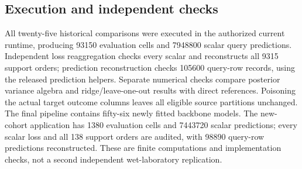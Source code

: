 \subsection{Execution and independent checks}
All twenty-five historical comparisons were executed in the authorized current runtime, producing 93150 evaluation cells and 7948800 scalar query predictions. Independent loss reaggregation checks every scalar and reconstructs all 9315 support orders; prediction reconstruction checks 105600 query-row records, using the released prediction helpers. Separate numerical checks compare posterior variance algebra and ridge/leave-one-out results with direct references. Poisoning the actual target outcome columns leaves all eligible source partitions unchanged. The final pipeline contains fifty-six newly fitted backbone models. The new-cohort application has 1380 evaluation cells and 7443720 scalar predictions; every scalar loss and all 138 support orders are audited, with 98890 query-row predictions reconstructed. These are finite computations and implementation checks, not a second independent wet-laboratory replication.
